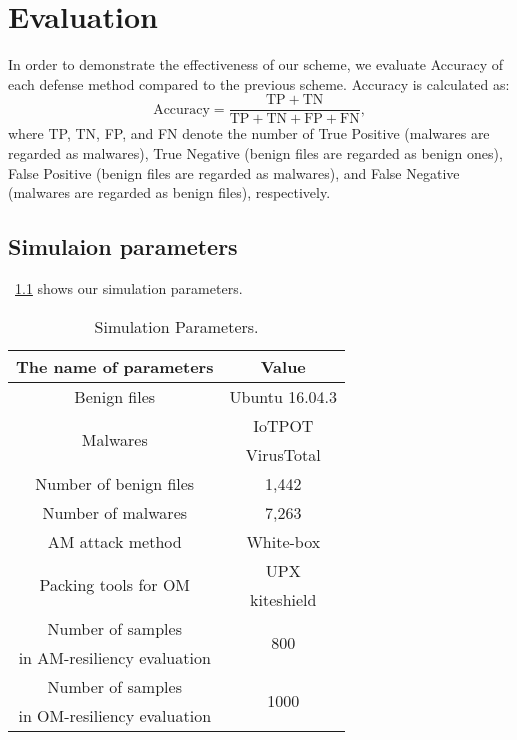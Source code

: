\chapter{Evaluation}\label{sec:evaluation} 
In order to demonstrate the effectiveness of our scheme, we evaluate Accuracy of each defense method compared to the previous scheme.
Accuracy is calculated as:
\begin{equation}
  \mathrm{Accuracy} = \frac{\mathrm{TP}+\mathrm{TN}}{\mathrm{TP} + \mathrm{TN} + \mathrm{FP} + \mathrm{FN}}, 
\end{equation}
where TP, TN, FP, and FN denote the number of True Positive (malwares are regarded as malwares), True Negative (benign files are regarded as benign ones), False Positive (benign files are regarded as malwares), and False Negative (malwares are regarded as benign files), respectively.  

\section{Simulaion parameters}
\tablename~\ref{tab:simulation_parameters} shows our simulation parameters.  
\begin{table}[p]
	\begin{center}
		\caption{Simulation Parameters.}
		\label{tab:simulation_parameters} 
		\begin{tabular}{|c|c|} \hline
			The name of parameters & Value\\ \hline \hline
			Benign files & Ubuntu 16.04.3\cite{ubuntu}\\ \hline
			\multirow{2}{*}{\hfill Malwares  \hfill} & IoTPOT\cite{iotpot} \\ 
																							 & VirusTotal\cite{virustotal}\\ \hline
			Number of benign files  & 1,442 \\  \hline
			Number of malwares  &  7,263 \\ \hline
			AM attack method & White-box \cite{am, yamafumi} \\ \hline
			\multirow{2}{*}{\hfill Packing tools for OM  \hfill} & UPX\cite{upx} \\ & kiteshield\cite{kiteshield} \\ \hline
			Number of samples  & \multirow{2}{*}{\hfill 800 \hfill} \\  
			in AM-resiliency evaluation & \\ \hline 
			Number of samples  & \multirow{2}{*}{\hfill 1000 \hfill} \\  
			in OM-resiliency evaluation & \\ \hline 
		\end{tabular}
	\end{center}
\end{table} 


